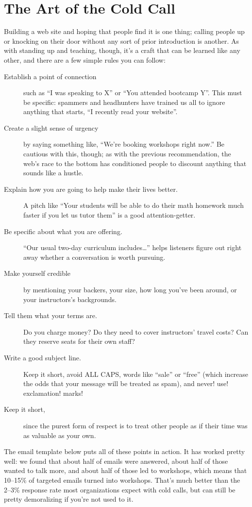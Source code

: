 \section{The Art of the Cold Call}\label{s:marketing-cold-call}

Building a web site and hoping that people find it is one thing; calling
people up or knocking on their door without any sort of prior
introduction is another. As with standing up and teaching, though, it's
a craft that can be learned like any other, and there are a few simple
rules you can follow:

\begin{description}
\item[Establish a point of connection]
such as ``I was speaking to X'' or ``You attended bootcamp Y''. This
must be specific: spammers and headhunters have trained us all to
ignore anything that starts, ``I recently read your website''.
\item[Create a slight sense of urgency]
by saying something like, ``We're booking workshops right now.'' Be
cautious with this, though; as with the previous recommendation, the
web's race to the bottom has conditioned people to discount anything
that sounds like a hustle.
\item[Explain how you are going to help make their lives better.]
A pitch like ``Your students will be able to do their math homework
much faster if you let us tutor them'' is a good attention-getter.
\item[Be specific about what you are offering.]
``Our usual two-day curriculum includes{\ldots}'' helps
listeners figure out right away whether a conversation is worth
pursuing.
\item[Make yourself credible]
by mentioning your backers, your size, how long you've been around,
or your instructors's backgrounds.
\item[Tell them what your terms are.]
Do you charge money? Do they need to cover instructors' travel
costs? Can they reserve seats for their own staff?
\item[Write a good subject line.]
Keep it short, avoid ALL CAPS, words like ``sale'' or ``free'' (which
increase the odds that your message will be treated as spam), and
never! use! exclamation! marks!
\item[Keep it short,]
since the purest form of respect is to treat other people as if
their time was as valuable as your own.
\end{description}

The email template below puts all of these points in action. It has
worked pretty well: we found that about half of emails were answered,
about half of those wanted to talk more, and about half of those led to
workshops, which means that 10--15\% of targeted emails turned into
workshops. That's much better than the 2--3\% response rate most
organizations expect with cold calls, but can still be pretty
demoralizing if you're not used to it.

